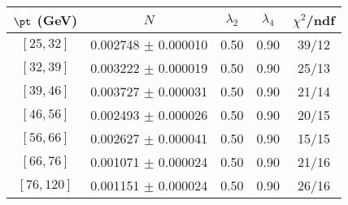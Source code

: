 \begin{tabular}{c||c|c|c|c}
$\pt$ (GeV) & $N$ & $\lambda_{2}$ & $\lambda_4$  & $\chi^2$/ndf  \\
\hline
$[25, 32]$ & 0.002748 $\pm$ 0.000010 & 0.50 & 0.90 & 39/12\\
$[32, 39]$ & 0.003222 $\pm$ 0.000019 & 0.50 & 0.90 & 25/13\\
$[39, 46]$ & 0.003727 $\pm$ 0.000031 & 0.50 & 0.90 & 21/14\\
$[46, 56]$ & 0.002493 $\pm$ 0.000026 & 0.50 & 0.90 & 20/15\\
$[56, 66]$ & 0.002627 $\pm$ 0.000041 & 0.50 & 0.90 & 15/15\\
$[66, 76]$ & 0.001071 $\pm$ 0.000024 & 0.50 & 0.90 & 21/16\\
$[76, 120]$ & 0.001151 $\pm$ 0.000024 & 0.50 & 0.90 & 26/16\\
\end{tabular}
